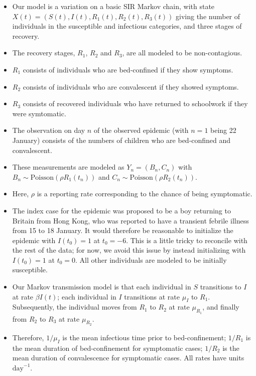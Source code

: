 \documentclass[]{article}
\begin{document}
\begin{itemize}
\item
  Our model is a variation on a basic SIR Markov chain, with state
  \(X(t)=(S(t),I(t),R_1(t),R_2(t),R_3(t) )\) giving the number of
  individuals in the susceptible and infectious categories, and three
  stages of recovery.
\item
  The recovery stages, \(R_1\), \(R_2\) and \(R_3\), are all modeled to
  be non-contagious.
\item
  \(R_1\) consists of individuals who are bed-confined if they show
  symptoms.
\item
  \(R_2\) consists of individuals who are convalescent if they showed
  symptoms.
\item
  \(R_3\) consists of recovered individuals who have returned to
  schoolwork if they were symtomatic.
\item
  The observation on day \(n\) of the observed epidemic (with \(n=1\)
  being 22 January) consists of the numbers of children who are
  bed-confined and convalescent.
\item
  These measurements are modeled as \(Y_n=(B_n,C_n)\) with
  \(B_n\sim\mathrm{Poisson}(\rho R_1(t_n))\) and
  \(C_n\sim\mathrm{Poisson}(\rho R_2(t_n))\).
\item
  Here, \(\rho\) is a reporting rate corresponding to the chance of
  being symptomatic.
\item
  The index case for the epidemic was proposed to be a boy returning to
  Britain from Hong Kong, who was reported to have a transient febrile
  illness from 15 to 18 January. It would therefore be reasonable to
  initialize the epidemic with \(I(t_0)=1\) at \(t_0=-6\). This is a
  little tricky to reconcile with the rest of the data; for now, we
  avoid this issue by instead initializing with \(I(t_0)=1\) at
  \(t_0=0\). All other individuals are modeled to be initially
  susceptible.
\item
  Our Markov transmission model is that each individual in \(S\)
  transitions to \(I\) at rate \(\beta I(t)\); each individual in \(I\)
  transitions at rate \(\mu_I\) to \(R_1\). Subsequently, the individual
  moves from \(R_1\) to \(R_2\) at rate \(\mu_{R_1}\), and finally from
  \(R_2\) to \(R_3\) at rate \(\mu_{R_2}\).
\item
  Therefore, \(1/\mu_I\) is the mean infectious time prior to
  bed-confinement; \(1/R_1\) is the mean duration of bed-confinement for
  symptomatic cases; \(1/R_2\) is the mean duration of convalescence for
  symptomatic cases. All rates have units \(\mathrm{day}^{-1}\).

\end{itemize}
\end{document}
